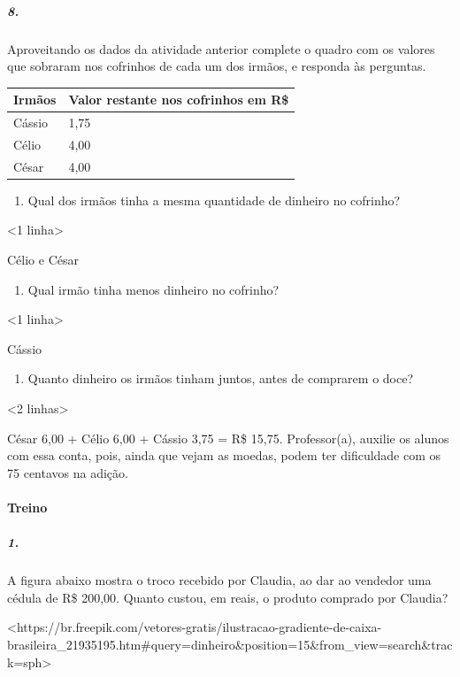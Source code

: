 \subparagraph{8.}\label{section-64}

Aproveitando os dados da atividade anterior complete o quadro com os
valores que sobraram nos cofrinhos de cada um dos irmãos, e responda às
perguntas.

\begin{longtable}[]{@{}ll@{}}
\toprule
Irmãos & Valor restante nos cofrinhos em R\$\tabularnewline
\midrule
\endhead
Cássio & 1,75\tabularnewline
Célio & 4,00\tabularnewline
César & 4,00\tabularnewline
\bottomrule
\end{longtable}

\begin{enumerate}
\def\labelenumi{\alph{enumi})}
\item
  Qual dos irmãos tinha a mesma quantidade de dinheiro no cofrinho?
\end{enumerate}

\textless{}1 linha\textgreater{}

Célio e César

\begin{enumerate}
\def\labelenumi{\alph{enumi})}
\item
  Qual irmão tinha menos dinheiro no cofrinho?
\end{enumerate}

\textless{}1 linha\textgreater{}

Cássio

\begin{enumerate}
\def\labelenumi{\alph{enumi})}
\item
  Quanto dinheiro os irmãos tinham juntos, antes de comprarem o doce?
\end{enumerate}

\textless{}2 linhas\textgreater{}

César 6,00 + Célio 6,00 + Cássio 3,75 = R\$ 15,75. Professor(a), auxilie
os alunos com essa conta, pois, ainda que vejam as moedas, podem ter
dificuldade com os 75 centavos na adição.

\paragraph{Treino}\label{treino-4}

\subparagraph{1.}\label{section-65}

A figura abaixo mostra o troco recebido por Claudia, ao dar ao vendedor
uma cédula de R\$ 200,00. Quanto custou, em reais, o produto comprado
por Claudia?

\textless{}https://br.freepik.com/vetores-gratis/ilustracao-gradiente-de-caixa-brasileira\_21935195.htm\#query=dinheiro\&position=15\&from\_view=search\&track=sph\textgreater{}

